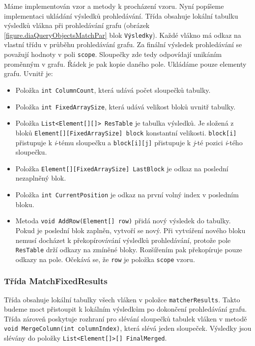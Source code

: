 Máme implementován vzor a metody k procházení vzoru.
Nyní popíšeme implementaci ukládání výsledků prohledávání.
Třída obsahuje lokální tabulku výsledků vlákna při prohledávání grafu (obrázek \ref{figure.diaQueryObjectsMatchPar} blok \texttt{Výsledky}). 
Každé vlákno má odkaz na vlastní třídu v průběhu prohledávání grafu.
Za finální výsledek prohledávání se považují hodnoty v poli \texttt{scope}.
Sloupečky zde tedy odpovídají unikáním proměnným v grafu.
Řádek je pak kopie daného pole.
Ukládáme pouze elementy grafu.
Uvnitř je:
\begin{itemize}
\item Položka \texttt{int ColumnCount}, která udává počet sloupečků tabulky. 
\item Položka \texttt{int FixedArraySize}, která udává velikost bloků uvnitř tabulky.
\item Položka \texttt{List<Element[][]> ResTable} je tabulka výsledků. 
Je složená z bloků \texttt{Element[][FixedArraySize] block} konstantní velikosti.
\texttt{block[i]} přistupuje k \textit{i}-tému sloupečku a \texttt{block[i][j]} přistupuje k \textit{j}-té pozici \textit{i}-tého sloupečku.
\item Položka \texttt{Element[][FixedArraySize] LastBlock} je odkaz na poslední nezaplněný blok.
\item Položka \texttt{int CurrentPosition} je odkaz na první volný index v posledním bloku.
\item Metoda \texttt{void AddRow(Element[] row)} přidá nový výsledek do tabulky.
Pokud je poslední blok zaplněn, vytvoří se nový.
Při vytváření nového bloku nemusí docházet k překopírovávání výsledků prohledávání, protože pole \texttt{ResTable} drží odkazy na zmíněné bloky.
Rozšířením pak překopíruje pouze odkazy na pole.
Očekává se, že \texttt{row} je položka \texttt{scope} vzoru. 

\end{itemize}

\subsubsection{Třída MatchFixedResults}

Třída obsahuje lokální tabulky všech vláken v položce \texttt{matcherResults}.
Takto budeme moct přistoupit k lokálním výsledkům po dokončení prohledávání grafu.
Třída zároveň poskytuje rozhraní pro slévání sloupečků tabulek vláken v metodě \texttt{void MergeColumn(int columnIndex)}, která slévá jeden sloupeček.
Výsledky jsou slévány do položky \texttt{List<Element[]>[] FinalMerged}.

